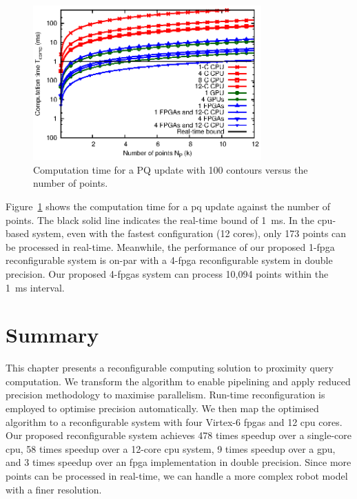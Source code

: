 \begin{figure}[ht]
\begin{center}
\includegraphics[width=0.78\textwidth]{3_precision/figures/fig_scalability}
\end{center}
\caption{Computation time for a PQ update with 100 contours versus the number of points.}
\label{fig:scalability}
\end{figure}

Figure~\ref{fig:scalability} shows the computation time for a \gls{pq} update against the number of points.
The black solid line indicates the real-time bound of 1~ms.
In the \gls{cpu}-based system, even with the fastest configuration (12 cores), only 173 points can be processed in real-time.
Meanwhile, the performance of our proposed 1-\gls{fpga} reconfigurable system is on-par with a 4-\gls{fpga} reconfigurable system in double precision.
Our proposed 4-\gls{fpga}s system can process 10,094 points within the 1~ms interval.


\section{Summary}
\label{sec:precision_summary}

This chapter presents a reconfigurable computing solution to proximity query computation.
We transform the algorithm to enable pipelining and apply reduced precision methodology to maximise parallelism.
Run-time reconfiguration is employed to optimise precision automatically.
We then map the optimised algorithm to a reconfigurable system with four Virtex-6 \gls{fpga}s and 12 \gls{cpu} cores.
Our proposed reconfigurable system achieves 478 times speedup over a single-core \gls{cpu}, 58 times speedup over a 12-core \gls{cpu} system, 9 times speedup over a \gls{gpu}, and 3 times speedup over an \gls{fpga} implementation in double precision.
Since more points can be processed in real-time, we can handle a more complex robot model with a finer resolution.

